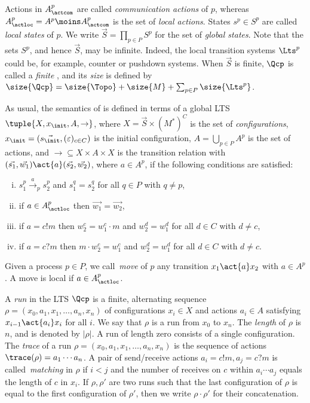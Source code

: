 \documentclass{LMCS}
\begin{document}
\noindent Actions in $A^p_\actcom$ are called \emph{communication actions} of
$p$, whereas $A_\actloc^p=A^p\moins A_\actcom^p$ is the set of
\emph{local actions}. States $s^p\in S^p$ are called
\emph{local states} of $p$. We write $\vec{S}=\prod_{p\in P}S^p$ for the
set of \emph{global states}. Note that the sets $S^p$, and
hence $\vec{S}$, may be infinite.  Indeed, the local transition
systems $\Lts^p$ could be, for example, counter
or pushdown systems.  When $\vec{S}$
is finite, $\Qcp$ is called a \emph{finite} \qcp,
and its \emph{size} is defined by
$\size{\Qcp} = \size{\Topo} + \size{M} + \sum_{p \in P} \size{\Lts^p}$.

\smallskip

As usual, the semantics of \qcp is defined in terms of a global LTS
$\tuple{X,x_\init,A,\rightarrow}$, where $X = \vec{S} \times
  (M^*)^C$ is the set of \emph{configurations}, $x_\init = (\vec{s_\init},
   (\varepsilon)_{c \in C})$ is the initial configuration,
  $A = \bigcup_{p \in P} A^p$ is the set of actions, and
  $\rightarrow \mathop{\subseteq} X \times A \times X$ is
  the transition relation with $(\vec{s_1}, \vec{w_1}) \act{a} (\vec{s_2},
  \vec{w_2})$, where $a \in A^p$, if 
  the following conditions are satisfied:
  \begin{enumerate}[(i)]
  \item $s_1^p \xrightarrow{a}_p s_2^p$ and $s_1^q = s_2^q$ for all $q
    \in P$ with $q \neq p$,
  \item if $a \in A^p_\actloc$ then $\vec{w_1} = \vec{w_2}$,
  \item if $a = c!m$ then $w_2^c = w_1^c \cdot m$ and $w_2^d = w_1^d$ for all $d \in C$ with $d \neq c$,
  \item if $a = c?m$ then $m \cdot w_2^c = w_1^c$ and $w_2^d = w_1^d$ for all $d \in C$ with $d \neq c$.
  \end{enumerate}
Given a process $p \in P$, we call~\emph{move} of $p$ any transition
$x_1 \act{a} x_2$ with $a \in A^p$. A move is local if $a \in
A_\actloc^p$.

\medskip

A \emph{run} in the LTS $\Qcp$ is a
finite, alternating sequence $\rho=(x_0,a_1,x_1,\ldots,a_n,x_n)$ of
configurations $x_i\in X$ and actions $a_i\in A$ satisfying
$x_{i-1} \act{a_i} x_i$ for all $i$. We say
that $\rho$ is a run from $x_0$ to $x_n$. The
\emph{length} of $\rho$ is $n$, and is denoted by $|\rho|$.
A run of length zero consists of a single configuration.
The \emph{trace} of a run
    $\rho = (x_0,a_1,x_1,\ldots,a_n,x_n)$ is the sequence of actions
    $\trace(\rho) = a_1 \cdots a_n$.
A pair of send/receive
actions $a_i=c!m, a_j=c?m$ is called~\emph{matching} in
$\rho$ if $i<j$ and the number of receives on $c$ within
$a_i \cdots a_j$ equals the length of $c$ in $x_i$.
If $\rho,\rho'$ are two runs such that the last configuration of $\rho$
is equal to the first configuration of $\rho'$, then we write
$\rho\cdot\rho'$ for their concatenation.
\end{document}
